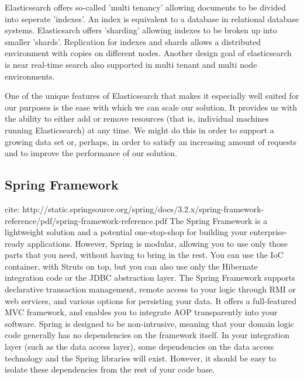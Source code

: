 Elasticsearch offers so-called 'multi tenancy' allowing documents to be divided into seperate 'indexes'. An index is equivalent to a database in relational database systems. Elasticsarch offers 'sharding' allowing indexes to be broken up into smaller 'shards'. 
Replication for indexes and shards allows a distributed environment with copies on different nodes. Another design goal of elasticsearch is near real-time search also supported in multi tenant and multi node environments.


One of the unique features of Elasticsearch that makes it especially well suited for our purposes is the ease with which we can scale our solution. It provides us with the ability to either
add or remove resources (that is, individual machines running Elasticsearch) at any time. We
might do this in order to support a growing data set or, perhaps, in order to satisfy an increasing amount of requests and to improve the performance of our solution.


\subsection{Spring Framework\label{sec:back_sp_fr}}
cite: http://static.springsource.org/spring/docs/3.2.x/spring-framework-reference/pdf/spring-framework-reference.pdf
The Spring Framework is a lightweight solution and a potential one-stop-shop for building your
enterprise-ready applications. However, Spring is modular, allowing you to use only those parts that
you need, without having to bring in the rest. You can use the IoC container, with Struts on top, but you
can also use only the Hibernate integration code or the JDBC abstraction layer. The Spring Framework
supports declarative transaction management, remote access to your logic through RMI or web services,
and various options for persisting your data. It offers a full-featured MVC framework, and enables you
to integrate AOP transparently into your software.
Spring is designed to be non-intrusive, meaning that your domain logic code generally has no
dependencies on the framework itself. In your integration layer (such as the data access layer), some
dependencies on the data access technology and the Spring libraries will exist. However, it should be
easy to isolate these dependencies from the rest of your code base.
